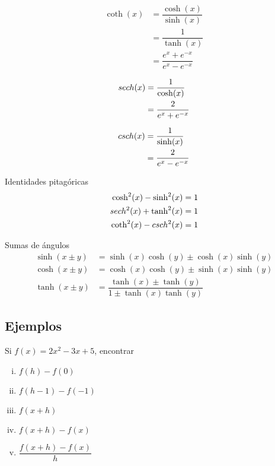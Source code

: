 {}
\begin{align}
\coth(x) &= \dfrac{\cosh(x)}{\sinh(x)}\\ 
& = \dfrac{1}{\tanh(x)}\\ 
& = \dfrac{e^{x}+e^{-x}}{e^{x}-e^{-x}} 
\end{align}

{}
 \begin{align}
sech(x)&= \dfrac{1}{\cosh(x)} \\ 
&= \dfrac{2}{e^{x}+e^{-x}}
\end{align}

{}
\begin{align}
csch(x)&= \dfrac{1}{\sinh(x)} \\ 
&= \dfrac{2}{e^{x}-e^{-x}}
\end{align}

{Identidades pitagóricas}
\begin{align}
\cosh^{2}(x)-\sinh^{2}(x)&= 1\\
sech^{2}(x)+\tanh^{2}(x)&= 1\\
\coth^{2}(x)-csch^{2}(x)&= 1
\end{align}

{Sumas de ángulos}
 \begin{align}
\sinh(x\pm y) &= \sinh(x)\cosh(y)\pm \cosh(x)\sinh(y)\\
\cosh(x\pm y) &= \cosh(x)\cosh(y)\pm \sinh(x)\sinh(y)\\
\tanh(x\pm y) &= \dfrac{\tanh(x)\pm \tanh(y)}{1\pm \tanh(x)\tanh(y)}
\end{align}

\subsection{Ejemplos}
{}
\begin{problema}
\label{solved 1.4}
Si $f(x)=2x^{2}-3x+5$, encontrar
\begin{enumerate}[(i)]
 \item $f(h)-f(0)$
 
 \item $f(h-1)-f(-1)$
 
 \item $f(x+h)$
 
 \item $f(x+h)-f(x)$
 
 \item $\dfrac{f(x+h)-f(x)}{h}$
\end{enumerate}
\end{problema}


